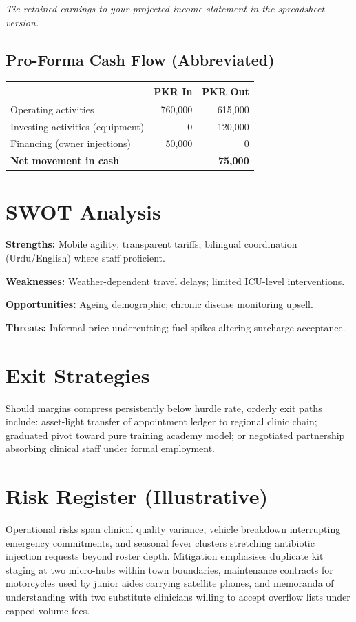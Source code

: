 \documentclass[12pt,a4paper]{report}
\begin{document}
\noindent\textit{Tie retained earnings to your projected income statement in the spreadsheet version.}

\section{Pro-Forma Cash Flow (Abbreviated)}
\begin{tabular}{@{}lrr@{}}
\toprule
 & \textbf{PKR In} & \textbf{PKR Out} \\
\midrule
Operating activities & 760{,}000 & 615{,}000 \\
Investing activities (equipment) & 0 & 120{,}000 \\
Financing (owner injections) & 50{,}000 & 0 \\
\midrule
\textbf{Net movement in cash} & & \textbf{75{,}000} \\
\bottomrule
\end{tabular}

\chapter{SWOT Analysis}

\textbf{Strengths:} Mobile agility; transparent tariffs; bilingual coordination (Urdu/English) where staff proficient.

\textbf{Weaknesses:} Weather-dependent travel delays; limited ICU-level interventions.

\textbf{Opportunities:} Ageing demographic; chronic disease monitoring upsell.

\textbf{Threats:} Informal price undercutting; fuel spikes altering surcharge acceptance.

\chapter{Exit Strategies}

Should margins compress persistently below hurdle rate, orderly exit paths include: asset-light transfer of appointment ledger to regional clinic chain; graduated pivot toward pure training academy model; or negotiated partnership absorbing clinical staff under formal employment.

\appendix

\chapter{Risk Register (Illustrative)}

Operational risks span clinical quality variance, vehicle breakdown interrupting emergency commitments, and seasonal fever clusters stretching antibiotic injection requests beyond roster depth. Mitigation emphasises duplicate kit staging at two micro-hubs within town boundaries, maintenance contracts for motorcycles used by junior aides carrying satellite phones, and memoranda of understanding with two substitute clinicians willing to accept overflow lists under capped volume fees.
\end{document}
